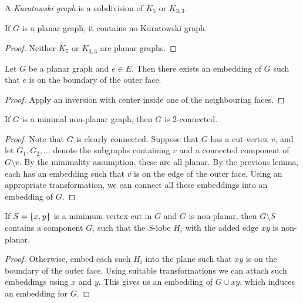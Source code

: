 \begin{definicija}
A \emph{Kuratowski graph} is a subdivision
of $K_5$ or $K_{3,3}$.
\end{definicija}

\begin{trditev}
If $G$ is a planar graph, it contains no Kuratowski graph.
\end{trditev}

\begin{proof}
Neither $K_5$ or $K_{3,3}$ are planar graphs.
\end{proof}

\begin{lema}
Let $G$ be a planar graph and $e \in E$. Then there exists an
embedding of $G$ such that $e$ is on the boundary of the outer
face.
\end{lema}

\begin{proof}
Apply an inversion with center inside one of the neighbouring
faces.
\end{proof}

\begin{lema}
If $G$ is a minimal non-planar graph, then $G$ is $2$-connected.
\end{lema}

\begin{proof}
Note that $G$ is clearly connected. Suppose that $G$ has a
cut-vertex $v$, and let $G_1, G_2, \dots$ denote the subgraphs
containing $v$ and a connected component of $G \setminus v$. By the
minimality assumption, these are all planar. By the previous lemma,
each has an embedding such that $v$ is on the edge of the outer
face. Using an appropriate transformation, we can connect all these
embeddings into an embedding of $G$.
\end{proof}


\begin{lema}
If $S = \left\{x,y\right\}$ is a minimum vertex-cut in $G$ and $G$ is
non-planar, then $G \setminus S$ contains a component $G_i$ such
that the $S$-lobe $H_i$ with the added edge $xy$ is non-planar.
\end{lema}

\begin{proof}
Otherwise, embed each such $H_i$ into the plane such that $xy$ is
on the boundary of the outer face. Using suitable transformations
we can attach such embeddings using $x$ and $y$. This gives us an
embedding of $G \cup xy$, which induces an embedding for $G$.
\end{proof}

